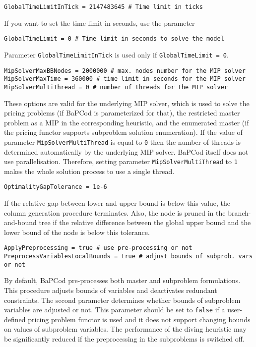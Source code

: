 \documentclass[10pt,a4paper]{article}
\newcommand{\bc}{BaPCod\xspace}
\begin{document}
\lstset{style=comstyle}

\begin{lstlisting}
GlobalTimeLimitInTick = 2147483645 # Time limit in ticks 
\end{lstlisting}
If you want to set the time limit in seconds, use the parameter
\begin{lstlisting}
GlobalTimeLimit = 0 # Time limit in seconds to solve the model 
\end{lstlisting}
Parameter \verb+GlobalTimeLimitInTick+ is used only if \verb+GlobalTimeLimit = 0+.

\begin{lstlisting}
MipSolverMaxBBNodes = 2000000 # max. nodes number for the MIP solver
MipSolverMaxTime = 360000 # time limit in seconds for the MIP solver
MipSolverMultiThread = 0 # number of threads for the MIP solver
\end{lstlisting}
These options are valid for the underlying MIP solver, which is used to solve the pricing problems (if \bc is
parameterized for that), the restricted master problem as a MIP in the corresponding heuristic, and the enumerated
master (if the pricing functor supports subproblem solution enumeration). If the value of parameter
\verb+MipSolverMultiThread+ is equal to \verb+0+ then the number of threads is determined automatically by the
underlying MIP solver. \bc itself does not use parallelisation. Therefore, setting parameter \verb+MipSolverMultiThread+
to \verb+1+ makes the whole solution process to use a single thread.

\begin{lstlisting}
OptimalityGapTolerance = 1e-6
\end{lstlisting}
If the relative gap between lower and upper bound is below this value, the column generation procedure terminates. Also,
the node is pruned in the branch-and-bound tree if the relative difference between the global upper bound and the lower
bound of the node is below this tolerance.

\begin{lstlisting}
ApplyPreprocessing = true # use pre-processing or not
PreprocessVariablesLocalBounds = true # adjust bounds of subprob. vars or not
\end{lstlisting}
By default, \bc pre-processes both master and subproblem formulations. This procedure adjusts bounds of variables and
deactivates redundant constraints. The second parameter determines whether bounds of subproblem variables are adjusted
or not. This parameter should be set to \verb+false+ if a user-defined pricing problem functor is used and it does not
support changing bounds on values of subproblem variables. The performance of the diving heuristic may be significantly
reduced if the preprocessing in the subproblems is switched off. 
\end{document}
